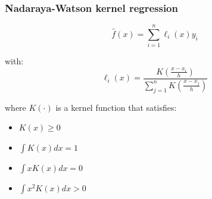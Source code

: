 \documentclass[pdf]{beamer}\usepackage[]{graphicx}\usepackage[]{color}
\newenvironment{knitrout}{}{} %
\begin{document}
\begin{frame}
\begin{columns}
\begin{knitrout}
{}



\end{knitrout}
\end{columns}
\end{frame}

\begin{frame}
\frametitle{Nadaraya-Watson kernel regression}

$$
\hat{f}(x) = \sum_{i=1}^n \ell_i(x) y_i
$$

with:
$$
\ell_i(x) = \frac{K\left(\frac{x-x_i}{h}\right)}{\sum_{j=1}^n K\left(\frac{x-x_j}{h}\right)}
$$

where $K(\cdot)$ is a kernel function that satisfies:
\begin{itemize}
\item $ K(x)\geq 0$
\item $ \int K(x)dx=1$
\item $ \int xK(x)dx=0$
\item $ \int x^2K(x)dx>0$
\end{itemize}



\end{frame}
\end{document}
